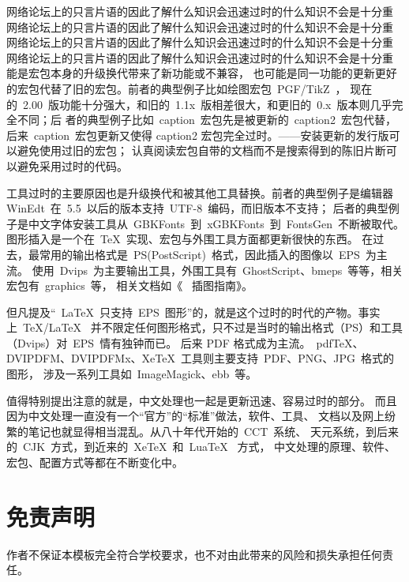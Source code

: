 网络论坛上的只言片语的因此了解什么知识会迅速过时的什么知识不会是十分重
网络论坛上的只言片语的因此了解什么知识会迅速过时的什么知识不会是十分重
网络论坛上的只言片语的因此了解什么知识会迅速过时的什么知识不会是十分重
网络论坛上的只言片语的因此了解什么知识会迅速过时的什么知识不会是十分重
能是宏包本身的升级换代带来了新功能或不兼容，
也可能是同一功能的更新更好的宏包代替了旧的宏包。前者的典型例子比如绘图宏包~PGF/TikZ~，
现在的~2.00~版功能十分强大，和旧的~1.1x~版相差很大，和更旧的~0.x~版本则几乎完全不同；后
者的典型例子比如~caption~宏包先是被更新的~caption2~宏包代替，后来~caption~宏包更新又使得
caption2 宏包完全过时。——安装更新的发行版可以避免使用过旧的宏包；
认真阅读宏包自带的文档而不是搜索得到的陈旧片断可以避免采用过时的代码。

工具过时的主要原因也是升级换代和被其他工具替换。前者的典型例子是编辑器
WinEdt~在~5.5~以后的版本支持~UTF-8~编码，而旧版本不支持；
后者的典型例子是中文字体安装工具从~GBKFonts~到~xGBKFonts~到~FontsGen~不断被取代。
图形插入是一个在~\TeX~实现、宏包与外围工具方面都更新很快的东西。
在过去，最常用的输出格式是~PS(PostScript)~格式，因此插入的图像以~EPS~为主流。
使用~Dvips~为主要输出工具，外围工具有~GhostScript、bmeps~等等，相关宏包有~graphics~等，
相关文档如《\LaTeXe{}~ 插图指南》。

但凡提及“~\LaTeX~只支持~EPS~图形”的，就是这个过时的时代的产物。事实上~\TeX/\LaTeX~
并不限定任何图形格式，只不过是当时的输出格式（PS）和工具（Dvips）对~EPS~情有独钟而已。
后来 PDF 格式成为主流。~pdf\TeX、DVIPDFM、DVIPDFMx、XeTeX~工具则主要支持~PDF、PNG、JPG~格式的图形，
涉及一系列工具如~ImageMagick、ebb~等。

值得特别提出注意的就是，中文处理也一起是更新迅速、容易过时的部分。
而且因为中文处理一直没有一个“官方”的“标准”做法，软件、工具、
文档以及网上纷繁的笔记也就显得相当混乱。从八十年代开始的~CCT~系统、
天元系统，到后来的~CJK~方式，到近来的~XeTeX~和~LuaTeX~ 方式，
中文处理的原理、软件、宏包、配置方式等都在不断变化中。

\section{免责声明}
作者不保证本模板完全符合学校要求，也不对由此带来的风险和损失承担任何责任。